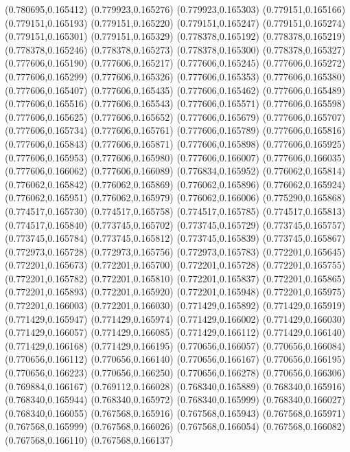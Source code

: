 (0.780695,0.165412)
(0.779923,0.165276)
(0.779923,0.165303)
(0.779151,0.165166)
(0.779151,0.165193)
(0.779151,0.165220)
(0.779151,0.165247)
(0.779151,0.165274)
(0.779151,0.165301)
(0.779151,0.165329)
(0.778378,0.165192)
(0.778378,0.165219)
(0.778378,0.165246)
(0.778378,0.165273)
(0.778378,0.165300)
(0.778378,0.165327)
(0.777606,0.165190)
(0.777606,0.165217)
(0.777606,0.165245)
(0.777606,0.165272)
(0.777606,0.165299)
(0.777606,0.165326)
(0.777606,0.165353)
(0.777606,0.165380)
(0.777606,0.165407)
(0.777606,0.165435)
(0.777606,0.165462)
(0.777606,0.165489)
(0.777606,0.165516)
(0.777606,0.165543)
(0.777606,0.165571)
(0.777606,0.165598)
(0.777606,0.165625)
(0.777606,0.165652)
(0.777606,0.165679)
(0.777606,0.165707)
(0.777606,0.165734)
(0.777606,0.165761)
(0.777606,0.165789)
(0.777606,0.165816)
(0.777606,0.165843)
(0.777606,0.165871)
(0.777606,0.165898)
(0.777606,0.165925)
(0.777606,0.165953)
(0.777606,0.165980)
(0.777606,0.166007)
(0.777606,0.166035)
(0.777606,0.166062)
(0.777606,0.166089)
(0.776834,0.165952)
(0.776062,0.165814)
(0.776062,0.165842)
(0.776062,0.165869)
(0.776062,0.165896)
(0.776062,0.165924)
(0.776062,0.165951)
(0.776062,0.165979)
(0.776062,0.166006)
(0.775290,0.165868)
(0.774517,0.165730)
(0.774517,0.165758)
(0.774517,0.165785)
(0.774517,0.165813)
(0.774517,0.165840)
(0.773745,0.165702)
(0.773745,0.165729)
(0.773745,0.165757)
(0.773745,0.165784)
(0.773745,0.165812)
(0.773745,0.165839)
(0.773745,0.165867)
(0.772973,0.165728)
(0.772973,0.165756)
(0.772973,0.165783)
(0.772201,0.165645)
(0.772201,0.165673)
(0.772201,0.165700)
(0.772201,0.165728)
(0.772201,0.165755)
(0.772201,0.165782)
(0.772201,0.165810)
(0.772201,0.165837)
(0.772201,0.165865)
(0.772201,0.165893)
(0.772201,0.165920)
(0.772201,0.165948)
(0.772201,0.165975)
(0.772201,0.166003)
(0.772201,0.166030)
(0.771429,0.165892)
(0.771429,0.165919)
(0.771429,0.165947)
(0.771429,0.165974)
(0.771429,0.166002)
(0.771429,0.166030)
(0.771429,0.166057)
(0.771429,0.166085)
(0.771429,0.166112)
(0.771429,0.166140)
(0.771429,0.166168)
(0.771429,0.166195)
(0.770656,0.166057)
(0.770656,0.166084)
(0.770656,0.166112)
(0.770656,0.166140)
(0.770656,0.166167)
(0.770656,0.166195)
(0.770656,0.166223)
(0.770656,0.166250)
(0.770656,0.166278)
(0.770656,0.166306)
(0.769884,0.166167)
(0.769112,0.166028)
(0.768340,0.165889)
(0.768340,0.165916)
(0.768340,0.165944)
(0.768340,0.165972)
(0.768340,0.165999)
(0.768340,0.166027)
(0.768340,0.166055)
(0.767568,0.165916)
(0.767568,0.165943)
(0.767568,0.165971)
(0.767568,0.165999)
(0.767568,0.166026)
(0.767568,0.166054)
(0.767568,0.166082)
(0.767568,0.166110)
(0.767568,0.166137)
